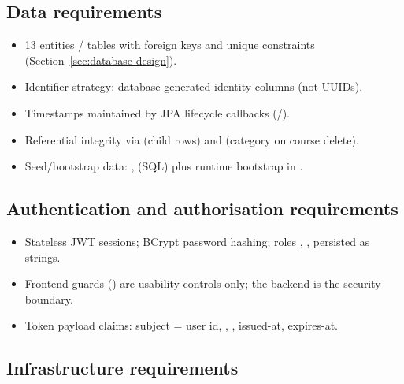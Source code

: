 \subsection{Data requirements}
\begin{itemize}
    \item 13 entities / tables with foreign keys and unique constraints (Section~\ref{sec:database-design}).
    \item Identifier strategy: database-generated  identity columns (not UUIDs).
    \item Timestamps maintained by JPA lifecycle callbacks (/).
    \item Referential integrity via  (child rows) and  (category on course delete).
    \item Seed/bootstrap data: ,  (SQL) plus runtime bootstrap in .
\end{itemize}

\subsection{Authentication and authorisation requirements}
\begin{itemize}
    \item Stateless JWT sessions; BCrypt password hashing; roles , ,  persisted as strings.
    \item Frontend guards () are usability controls only; the backend is the security boundary.
    \item Token payload claims: subject = user id, , , issued-at, expires-at.
\end{itemize}

\subsection{Infrastructure requirements}

